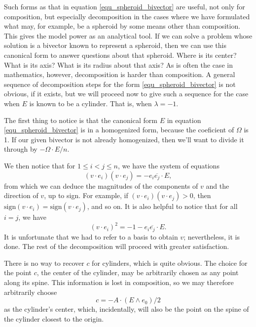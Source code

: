 \documentclass[12pt]{article}
\numberwithin{equation}{section}
\begin{document}
Such forms as that in equation \eqref{equ_spheroid_bivector} are useful, not only
for composition, but especially decomposition in the cases
where we have formulated what may, for example, be a spheroid by some means
other than composition.
This gives the model power as an analytical tool.  If we can solve a problem whose solution
is a bivector known to represent a spheroid, then we can use this canonical form to answer
questions about that spheroid.  Where is its center?  What is its axis?  What is its radius
about that axis?  As is often the case in mathematics, however, decomposition is
harder than composition.  A general sequence of decomposition steps for the
form \eqref{equ_spheroid_bivector} is not obvious, if it exists, but we will
proceed now to give such a sequence for the case when $E$ is known
to be a cylinder.  That is, when $\lambda=-1$.

The first thing to notice is that the canonical form $E$ in equation \eqref{equ_spheroid_bivector}
is in a homogenized form, because the coeficient of $\Omega$ is 1.  If our given bivector
is not already homogenized, then we'll want to divide it through by $-\Omega\cdot E/n$.

We then notice that for $1\leq i<j\leq n$, we have the system of equations
\begin{equation}
(v\cdot e_i)(v\cdot e_j) = -e_i\overline{e_j}\cdot E,
\end{equation}
from which we can deduce the magnitudes of the components of $v$ and the
direction of $v$, up to sign.  For example, if $(v\cdot e_i)(v\cdot e_j)>0$,
then $\mbox{sign}(v\cdot e_i)=\mbox{sign}(v\cdot e_j)$, and so on.
It is also helpful to notice that for all $i=j$, we have
\begin{equation}
(v\cdot e_i)^2 = -1 - e_i\overline{e_j}\cdot E.
\end{equation}
It is unfortunate that we had to refer to a basis to obtain $v$; nevertheless,
it is done.  The rest of the decomposition will proceed with greater satisfaction.

There is no way to recover $c$ for cylinders, which is quite obvious.
The choice for the point $c$, the center of the cylinder, may be arbitrarily
chosen as any point along its spine.  This information is lost in composition,
so we may therefore arbitrarily choose
\begin{equation}
c=-A\cdot(E\wedge e_0)/2
\end{equation}
as the cylinder's center, which, incidentally, will also be the point on the spine of
the cylinder closest to the origin.
\end{document}
